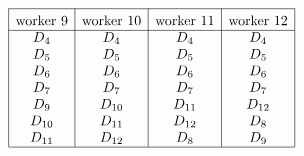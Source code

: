 \documentclass[conference,letterpaper]{IEEEtran}
\begin{document}
\begin{example}
\begin{align*}
\end{align*}
\begin{align*}
\begin{array}{rl|c|c|c|c|}\cline{3-3}\cline{4-4}\cline{5-5}\cline{6-6}
&&\rule{0pt}{1.2em}\mbox{worker 9}  & \rule{0pt}{1.2em}\mbox{worker 10} & \rule{0pt}{1.2em}\mbox{worker 11} & \rule{0pt}{1.2em}\mbox{worker 12} \\ \cline{3-3}\cline{4-4}\cline{5-5}\cline{6-6}
&& D_4 & D_4 & D_4 & D_4 \\
&& D_5 & D_5 & D_5 & D_5 \\
&& D_6 & D_6 & D_6 & D_6 \\
&& D_7 & D_7 & D_7 & D_7 \\
&& D_9 & D_{10} & D_{11} & D_{12} \\
&& D_{10} & D_{11} & D_{12} & D_8 \\
&& D_{11} & D_{12} & D_8 & D_9 \\
\cline{3-3}\cline{4-4}\cline{5-5}\cline{6-6}
\end{array}
\end{align*}


\end{example}
\end{document}
